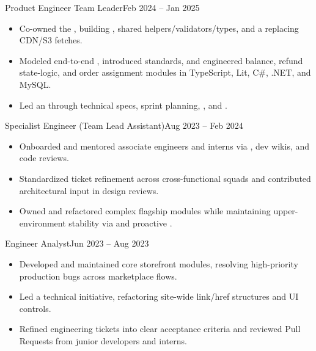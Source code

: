 \begin{TimelineRole}{Product Engineer Team Leader}{Feb 2024 – Jan 2025}
    \begin{itemize}
        \item Co-owned the , building , shared helpers/validators/types, and a  replacing CDN/S3 fetches.
        \item Modeled end-to-end , introduced  standards, and engineered balance, refund state-logic, and order assignment modules in TypeScript, Lit, C\#, .NET, and MySQL.
        \item Led an  through technical specs, sprint planning, , and .
    \end{itemize}
\end{TimelineRole}

\begin{TimelineRole}[last]{Specialist Engineer (Team Lead Assistant)}{Aug 2023 – Feb 2024}
    \begin{itemize}
        \item Onboarded and mentored associate engineers and interns via , dev wikis, and code reviews.
        \item Standardized ticket refinement across cross-functional squads and contributed architectural input in design reviews.
        \item Owned and refactored complex flagship modules while maintaining upper-environment stability via  and proactive .
    \end{itemize}
\end{TimelineRole}


\begin{TimelineRole}[last]{Engineer Analyst}{Jun 2023 – Aug 2023}
    \begin{itemize}
        \item Developed and maintained core storefront modules, resolving high-priority production bugs across marketplace flows.
        \item Led a technical  initiative, refactoring site-wide link/href structures and UI controls.
        \item Refined engineering tickets into clear acceptance criteria and reviewed Pull Requests from junior developers and interns.
    \end{itemize}
\end{TimelineRole}


